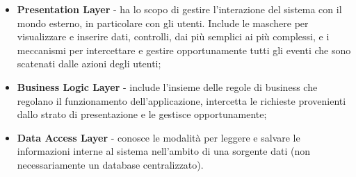 \begin{itemize}
	\item \textbf{Presentation Layer} - ha lo scopo di gestire l'interazione del sistema con il mondo esterno, in particolare con gli utenti. Include le maschere per visualizzare e inserire dati, controlli, dai più semplici ai più complessi, e i meccanismi per intercettare e gestire opportunamente tutti gli eventi che sono scatenati dalle azioni degli utenti;
	\item \textbf{Business Logic Layer} - include l'insieme delle regole di business che regolano il funzionamento dell'applicazione, intercetta le richieste provenienti dallo strato di presentazione e le gestisce opportunamente;
	\item \textbf{Data Access Layer} - conosce le modalità per leggere e salvare le informazioni interne al sistema nell'ambito di una sorgente dati (non necessariamente un database centralizzato).
\end{itemize}
